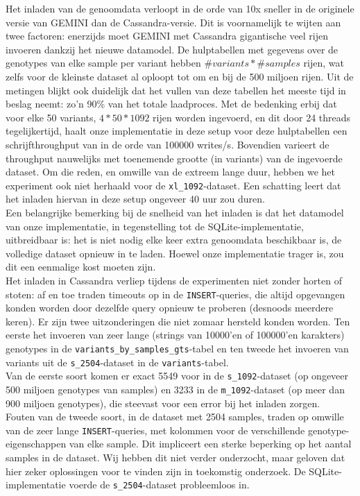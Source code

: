 Het inladen van de genoomdata verloopt in de orde van 10x sneller in de originele versie van GEMINI dan de Cassandra-versie. Dit is voornamelijk te wijten aan twee factoren: enerzijds moet GEMINI met Cassandra gigantische veel rijen invoeren dankzij het nieuwe datamodel. De hulptabellen met gegevens over de genotypes van elke sample per variant hebben $\#variants * \#samples$ rijen, wat zelfs voor de kleinste dataset al oploopt tot om en bij de 500 miljoen rijen. Uit de metingen blijkt ook duidelijk dat het vullen van deze tabellen het meeste tijd in beslag neemt: zo'n 90\% van het totale laadproces. Met de bedenking erbij dat voor elke 50 variants, $4 * 50 * 1092$ rijen worden ingevoerd, en dit door 24 threads tegelijkertijd, haalt onze implementatie in deze setup voor deze hulptabellen een schrijfthroughput van in de orde van 100000 writes/s. Bovendien varieert de throughput nauwelijks met toenemende grootte (in variants) van de ingevoerde dataset. Om die reden, en omwille van de extreem lange duur, hebben we het experiment ook niet herhaald voor de \texttt{xl\_1092}-dataset. Een schatting leert dat het inladen hiervan in deze setup ongeveer 40 uur zou duren.\\
Een belangrijke bemerking bij de snelheid van het inladen is dat het datamodel van onze implementatie, in tegenstelling tot de SQLite-implementatie, uitbreidbaar is: het is niet nodig elke keer extra genoomdata beschikbaar is, de volledige dataset opnieuw in te laden. Hoewel onze implementatie trager is, zou dit een eenmalige kost moeten zijn.\\

Het inladen in Cassandra verliep tijdens de experimenten niet zonder horten of stoten: af en toe traden timeouts op in de \texttt{INSERT}-queries, die altijd opgevangen konden worden door dezelfde query opnieuw te proberen (desnoods meerdere keren). Er zijn twee uitzonderingen die niet zomaar hersteld konden worden. Ten eerste het invoeren van zeer lange (strings van 10000'en of 100000'en karakters) genotypes in de \texttt{variants\_by\_samples\_gts}-tabel en ten tweede het invoeren van variants uit de \texttt{s\_2504}-dataset in de \texttt{variants}-tabel.\\
Van de eerste soort komen er exact 5549 voor in de \texttt{s\_1092}-dataset (op ongeveer 500 miljoen genotypes van samples) en 3233 in de \texttt{m\_1092}-dataset (op meer dan 900 miljoen genotypes), die steevast voor een error bij het inladen zorgen.\\
Fouten van de tweede soort, in de dataset met 2504 samples, traden op omwille van de zeer lange \texttt{INSERT}-queries, met kolommen voor de verschillende genotype-eigenschappen van elke sample. Dit impliceert een sterke beperking op het aantal samples in de dataset. Wij hebben dit niet verder onderzocht, maar geloven dat hier zeker oplossingen voor te vinden zijn in toekomstig onderzoek. De SQLite-implementatie voerde de \texttt{s\_2504}-dataset probleemloos in.

